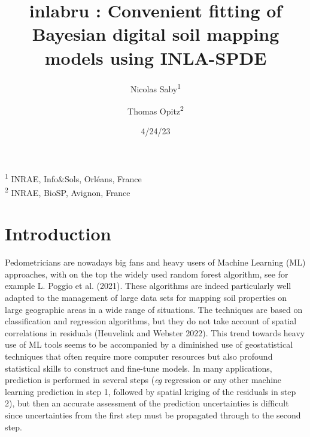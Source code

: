 \documentclass[
  a4paper,
]{article}
\title{inlabru : Convenient fitting of Bayesian digital soil mapping
models using INLA-SPDE}
\author{Nicolas Saby\textsuperscript{1} \and Thomas
Opitz\textsuperscript{2}}
\date{4/24/23}
\renewcommand*\contentsname{Table of contents}
\newcommand\contentsname{Table of contents}
\begin{document}
\maketitle
\ifdefined\Shaded\renewenvironment{Shaded}{\begin{tcolorbox}[enhanced, frame hidden, interior hidden, breakable, sharp corners, borderline west={3pt}{0pt}{shadecolor}, boxrule=0pt]}{\end{tcolorbox}}\fi

\renewcommand*\contentsname{Table of contents}
{
\hypersetup{linkcolor=}
\setcounter{tocdepth}{3}
\tableofcontents
}
\textsuperscript{1} INRAE, Info\&Sols, Orléans, France\\
\textsuperscript{2} INRAE, BioSP, Avignon, France

\hypertarget{introduction}{%
\section{Introduction}\label{introduction}}

Pedometricians are nowadays big fans and heavy users of Machine Learning
(ML) approaches, with on the top the widely used random forest
algorithm, see for example L. Poggio et al. (2021). These algorithms are
indeed particularly well adapted to the management of large data sets
for mapping soil properties on large geographic areas in a wide range of
situations. The techniques are based on classification and regression
algorithms, but they do not take account of spatial correlations in
residuals (Heuvelink and Webster 2022). This trend towards heavy use of
ML tools seems to be accompanied by a diminished use of geostatistical
techniques that often require more computer resources but also profound
statistical skills to construct and fine-tune models. In many
applications, prediction is performed in several steps (\emph{eg}
regression or any other machine learning prediction in step 1, followed
by spatial kriging of the residuals in step 2), but then an accurate
assessment of the prediction uncertainties is difficult since
uncertainties from the first step must be propagated through to the
second step.
\end{document}
